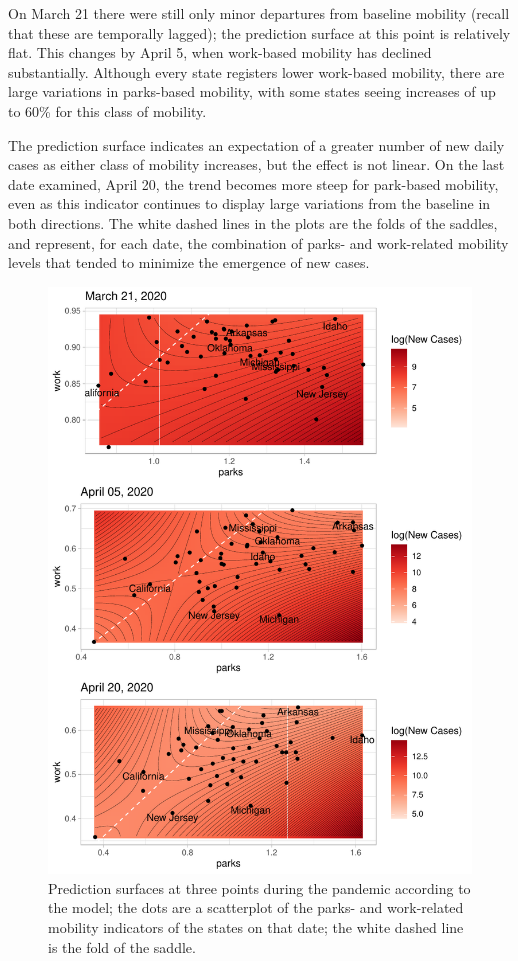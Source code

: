 \documentclass[]{elsarticle} %
\makeatletter
\def\maxwidth{\ifdim\Gin@nat@width>\linewidth\linewidth
\else\Gin@nat@width\fi}
\let\Oldincludegraphics\includegraphics
\renewcommand{\includegraphics}[1]{\Oldincludegraphics[width=\maxwidth]{#1}}
\makeatother
\begin{document}
On March 21 there were still only minor departures from baseline
mobility (recall that these are temporally lagged); the prediction
surface at this point is relatively flat. This changes by April 5, when
work-based mobility has declined substantially. Although every state
registers lower work-based mobility, there are large variations in
parks-based mobility, with some states seeing increases of up to 60\%
for this class of mobility.

The prediction surface indicates an expectation of a greater number of
new daily cases as either class of mobility increases, but the effect is
not linear. On the last date examined, April 20, the trend becomes more
steep for park-based mobility, even as this indicator continues to
display large variations from the baseline in both directions. The white
dashed lines in the plots are the folds of the saddles, and represent,
for each date, the combination of parks- and work-related mobility
levels that tended to minimize the emergence of new cases.

\begin{figure}
\centering
\includegraphics{Covid-19-Google-CMR-US_files/figure-latex/prediction-plots-1.pdf}
\caption{\label{fig:prediction-plots}Prediction surfaces at three points
during the pandemic according to the model; the dots are a scatterplot
of the parks- and work-related mobility indicators of the states on that
date; the white dashed line is the fold of the saddle.}
\end{figure}
\end{document}
